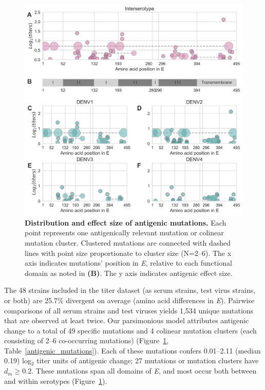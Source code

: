 \documentclass[11pt,oneside,letterpaper]{article}
\begin{document}
\begin{figure}[ht]
  \begin{centering}
  \includegraphics[width=\textwidth]{../figures/png/mutations_position_db.png}
  	\caption{\textbf{Distribution and effect size of antigenic mutations.}
	  Each point represents one antigenically relevant mutation or colinear mutation cluster.
    Clustered mutations are connected with dashed lines with point size proportionate to cluster size (N=2--6).
    The x axis indicates mutations' position in \textit{E}, relative to each functional domain as noted in \textbf{(B)}.
    The y axis indicates antigenic effect size.}
  	\label{mutation_positions}
  \end{centering}
\end{figure}

The 48 strains included in the titer dataset (as serum strains, test virus strains, or both) are 25.7\% divergent on average (amino acid differences in \textit{E}).
Pairwise comparisons of all serum strains and test viruses yields 1,534 unique mutations that are observed at least twice.
Our parsimonious model attributes antigenic change to a total of 49 specific mutations and 4 colinear mutation clusters (each consisting of 2--6 co-occurring mutations) (Figure~\ref{mutation_positions}, Table~\ref{antigenic_mutations}).
Each of these mutations confers 0.01--2.11 (median 0.19) log$_2$ titer units of antigenic change; 27 mutations or mutation clusters have $d_m \geq 0.2$.
These mutations span all domains of \textit{E}, and most occur both between and within serotypes (Figure~\ref{mutation_positions}).
\end{document}
